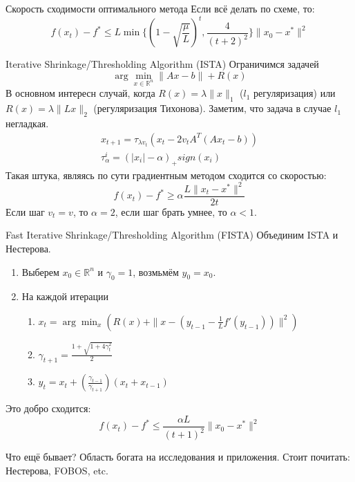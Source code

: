 \documentclass[14pt, fleqn, xcolor={dvipsnames, table}]{beamer}
\begin{document}
\begin{frame}{Скорость сходимости оптимального метода}
Если всё делать по схеме, то:
$$
f(x_t) - f^* \le L\min\{(1-\sqrt{\frac{\mu}{L}})^t, \frac{4}{(t+2)^2}\}\|x_0-x^*\|^2
$$
\end{frame}

\begin{frame}{Iterative Shrinkage/Thresholding Algorithm (ISTA)}
\small
Ограничимся задачей
$$
\arg\min_{x \in \mathbb{R}^n}\|Ax - b\| + R(x)
$$
В основном интересн случай, когда $R(x) = \lambda \|x\|_1$ ($l_1$ регуляризация) или $R(x)=\lambda\|Lx\|_2$ (регуляризация Тихонова).
Заметим, что задача в случае $l_1$ негладкая.
$$\begin{array}{l}
x_{t+1} = \tau_{\lambda v_t}(x_t - 2v_tA^T(Ax_t - b)) \\
\tau_{\alpha}^i = (|x_i| - \alpha)_{+}sign(x_i)
\end{array}$$
Такая штука, являясь по сути градиентным методом сходится со скоростью:
$$
f(x_t) - f^* \ge \alpha \frac{L\|x_t - x^*\|^2}{2t}
$$
Если шаг $v_t = v$, то $\alpha=2$, если шаг брать умнее, то $\alpha<1$.
\end{frame}

\begin{frame}{Fast Iterative Shrinkage/Thresholding Algorithm (FISTA)}
Объединим ISTA и Нестерова.
\begin{enumerate}
  \item Выберем $x_0 \in \mathbb{R}^n$ и $\gamma_0 = 1$, возмьмём $y_0=x_0$.
  \item На каждой итерации
  \begin{enumerate}
    \item $x_t = \arg\min_x(R(x) + \|x - (y_{t-1} - \frac{1}{L}f'(y_{t-1}))\|^2)$
    \item $\gamma_{t+1} = \frac{1 + \sqrt{1+4\gamma_t^2}}{2}$
    \item $y_t = x_t + (\frac{\gamma_{t-1}}{\gamma_{t+1}})(x_t + x_{t-1})$
  \end{enumerate}
\end{enumerate}
Это добро сходится:
$$
f(x_t) - f^* \le \frac{\alpha L}{(t+1)^2}\|x_0 - x^*\|^2
$$
\end{frame}

\begin{frame}{Что ещё бывает?}
Область богата на исследования и приложения. Стоит почитать: Нестерова, FOBOS, etc.
\end{frame}


\end{document}
